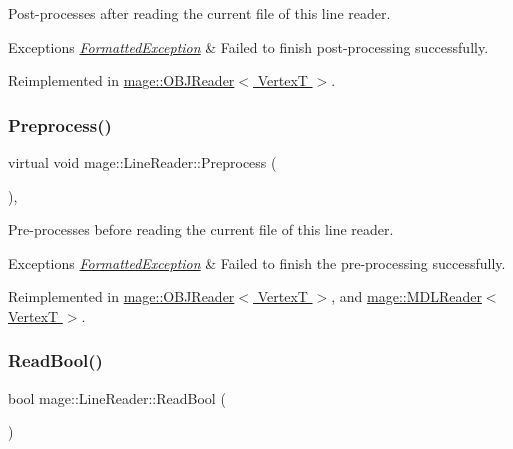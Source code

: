 Post-\/processes after reading the current file of this line reader.


\begin{DoxyExceptions}{Exceptions}
{\em \hyperlink{structmage_1_1_formatted_exception}{Formatted\+Exception}} & Failed to finish post-\/processing successfully. \\
\hline
\end{DoxyExceptions}


Reimplemented in \hyperlink{classmage_1_1_o_b_j_reader_a248977c8300575ed2bab04df26197919}{mage\+::\+O\+B\+J\+Reader$<$ Vertex\+T $>$}.

\hypertarget{classmage_1_1_line_reader_a4de135cfb0434be786cfcfd7959031ef}{}\label{classmage_1_1_line_reader_a4de135cfb0434be786cfcfd7959031ef} 
\subsubsection{\texorpdfstring{Preprocess()}{Preprocess()}}
{\footnotesize\ttfamily virtual void mage\+::\+Line\+Reader\+::\+Preprocess (\begin{DoxyParamCaption}{ }\end{DoxyParamCaption})\hspace{0.3cm}{\ttfamily [private]}, {\ttfamily [virtual]}}

Pre-\/processes before reading the current file of this line reader.


\begin{DoxyExceptions}{Exceptions}
{\em \hyperlink{structmage_1_1_formatted_exception}{Formatted\+Exception}} & Failed to finish the pre-\/processing successfully. \\
\hline
\end{DoxyExceptions}


Reimplemented in \hyperlink{classmage_1_1_o_b_j_reader_ae3a3ad3b50f1dd8dffe3109fc7dc2937}{mage\+::\+O\+B\+J\+Reader$<$ Vertex\+T $>$}, and \hyperlink{classmage_1_1_m_d_l_reader_a8b99fb3bdea5e9dae156b135c160c22d}{mage\+::\+M\+D\+L\+Reader$<$ Vertex\+T $>$}.

\hypertarget{classmage_1_1_line_reader_a86289c358afe9b3bc5c7789bb8a6af95}{}\label{classmage_1_1_line_reader_a86289c358afe9b3bc5c7789bb8a6af95} 
\subsubsection{\texorpdfstring{Read\+Bool()}{ReadBool()}}
{\footnotesize\ttfamily bool mage\+::\+Line\+Reader\+::\+Read\+Bool (\begin{DoxyParamCaption}{ }\end{DoxyParamCaption})\hspace{0.3cm}{\ttfamily [protected]}}

